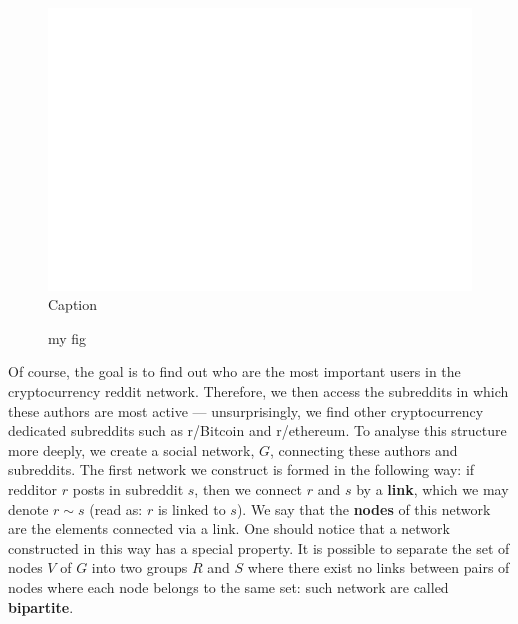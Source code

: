 \documentclass[twoside]{report}
\begin{document}
\begin{spacing}{1}
\begin{figure}
    \centering
    \includegraphics[scale=.25]{Reddit_Analysis/Network_Analysis/Network Graph of Related Subreddits.png}
    \caption{Caption}
    \label{fig:my_label}
\end{figure}

\begin{figure}

\begin{minipage}{.5\linewidth}
\centering
{}
\end{minipage}%
\begin{minipage}{.5\linewidth}
\centering
{}
\end{minipage}\par\medskip
\centering
{}
\caption{my fig}
\label{fig:main}
\end{figure}

Of course, the goal is to find out who are the most important users in the cryptocurrency reddit network. Therefore, we then access the subreddits in which these authors are most active --- unsurprisingly, we find other cryptocurrency dedicated subreddits such as r/Bitcoin and r/ethereum. To analyse this structure more deeply, we create a social network, $G$, connecting these authors and subreddits. The first network we construct is formed in the following way: if redditor $r$ posts in subreddit $s$, then we connect $r$ and $s$ by a \textbf{link}, which we may denote $r \sim s$ (read as: $r$ is linked to $s$). We say that the \textbf{nodes} of this network are the elements connected via a link. One should notice that a network constructed in this way has a special property. It is possible to separate the set of nodes $V$ of $G$ into two groups $R$ and $S$ where there exist no links between pairs of nodes where each node belongs to the same set: such network are called \textbf{bipartite}.


\end{spacing}
\end{document}
